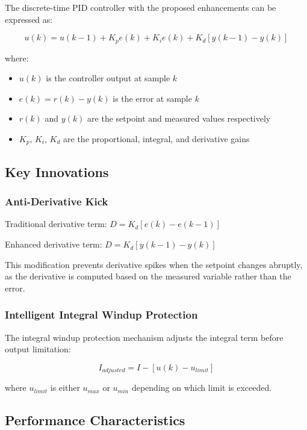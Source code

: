 \documentclass{article}
\begin{document}
The discrete-time PID controller with the proposed enhancements can be expressed as:

\begin{equation}
u(k) = u(k-1) + K_p e(k) + K_i e(k) + K_d [y(k-1) - y(k)]
\end{equation}

where:
\begin{itemize}
    \item $u(k)$ is the controller output at sample $k$
    \item $e(k) = r(k) - y(k)$ is the error at sample $k$
    \item $r(k)$ and $y(k)$ are the setpoint and measured values respectively
    \item $K_p$, $K_i$, $K_d$ are the proportional, integral, and derivative gains
\end{itemize}

\subsection{Key Innovations}

\subsubsection{Anti-Derivative Kick}

Traditional derivative term: $D = K_d[e(k) - e(k-1)]$

Enhanced derivative term: $D = K_d[y(k-1) - y(k)]$

This modification prevents derivative spikes when the setpoint changes abruptly, as the derivative is computed based on the measured variable rather than the error.

\subsubsection{Intelligent Integral Windup Protection}

The integral windup protection mechanism adjusts the integral term before output limitation:

\begin{equation}
I_{adjusted} = I - [u(k) - u_{limit}]
\end{equation}

where $u_{limit}$ is either $u_{max}$ or $u_{min}$ depending on which limit is exceeded.

\subsection{Performance Characteristics}
\end{document}
